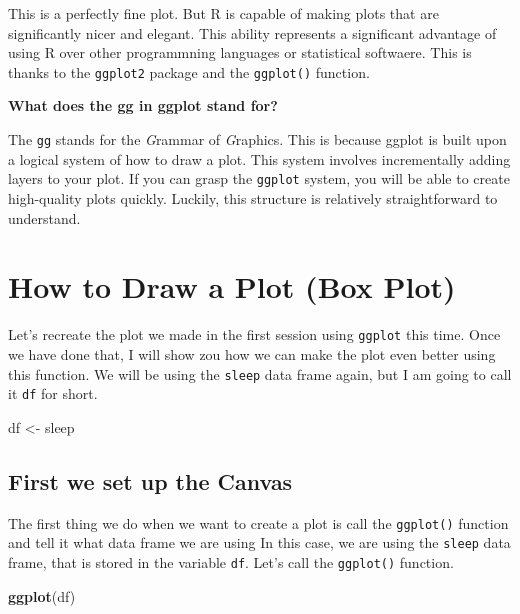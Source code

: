 \documentclass[
]{book}
\newenvironment{Shaded}{\begin{snugshade}}{\end{snugshade}}
\newcommand{\FunctionTok}[1]{\textcolor[rgb]{0.13,0.29,0.53}{\textbf{#1}}}
\newcommand{\NormalTok}[1]{#1}
\newcommand{\OtherTok}[1]{\textcolor[rgb]{0.56,0.35,0.01}{#1}}
\begin{document}
This is a perfectly fine plot. But R is capable of making plots that are significantly nicer and elegant. This ability represents a significant advantage of using R over other programmning languages or statistical softwaere. This is thanks to the \texttt{ggplot2} package and the \texttt{ggplot()} function.

\textbf{What does the gg in ggplot stand for?}

The \texttt{gg} stands for the \emph{G}rammar of \emph{G}raphics. This is because ggplot is built upon a logical system of how to draw a plot. This system involves incrementally adding layers to your plot. If you can grasp the \texttt{ggplot} system, you will be able to create high-quality plots quickly. Luckily, this structure is relatively straightforward to understand.

\hypertarget{how-to-draw-a-plot-box-plot}{%
\section{How to Draw a Plot (Box Plot)}\label{how-to-draw-a-plot-box-plot}}

Let's recreate the plot we made in the first session using \texttt{ggplot} this time. Once we have done that, I will show zou how we can make the plot even better using this function. We will be using the \texttt{sleep} data frame again, but I am going to call it \texttt{df} for short.

\begin{Shaded}
\begin{Highlighting}[]
\NormalTok{df }\OtherTok{\textless{}{-}}\NormalTok{ sleep }
\end{Highlighting}
\end{Shaded}

\hypertarget{first-we-set-up-the-canvas}{%
\subsection{First we set up the Canvas}\label{first-we-set-up-the-canvas}}

The first thing we do when we want to create a plot is call the \texttt{ggplot()} function and tell it what data frame we are using In this case, we are using the \texttt{sleep} data frame, that is stored in the variable \texttt{df}. Let's call the \texttt{ggplot()} function.

\begin{Shaded}
\begin{Highlighting}[]
\FunctionTok{ggplot}\NormalTok{(df)}
\end{Highlighting}
\end{Shaded}
\end{document}
